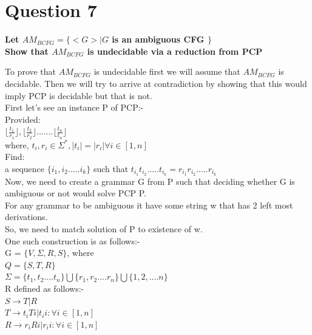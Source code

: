 \documentclass{article}
\begin{document}
\section{Question 7}

\textbf{Let $AM_{BCFG} = \{< G > | G$ is an ambiguous CFG $\}$ \\
    Show that $AM_{BCFG}$ is undecidable via a reduction from PCP\\}

To prove that $AM_{BCFG}$ is undecidable first we will assume that $AM_{BCFG}$ is decidable. Then 
we will try to arrive at contradiction by showing that this would imply PCP is decidable but that is not.\\

First let's see an instance P of PCP:- \\

Provided:\\
$\lfloor \frac{t_1}{r_1} \rfloor , \lfloor \frac{t_2}{r_2} \rfloor ....... \lfloor \frac{t_n}{t_n} \rfloor$ \\
where, $t_i , r_i \in \Sigma^* , |t_i| = |r_i| \forall i \in [1,n]$\\

Find:\\
a sequence $\{ i_1,i_2.....i_k \}$ such that $t_{i_1}t_{i_2}.....t_{i_k} = r_{i_1}r_{i_2}.....r_{i_k}$\\

Now, we need to create a grammar G from P such that deciding whether G is  ambiguous or not would solve PCP P.\\
For any grammar to be ambiguous it have some string w that has 2 left most derivations.\\
So, we need to match solution of P to existence of w.\\

One such construction is as follows:- \\

G = $\{ V,\Sigma, R, S \}$, where \\
$Q = \{S, T, R\}$\\
$\Sigma = \{t_1, t_2 .... t_n\} \bigcup \{r_1, r_2 .... r_n\} \bigcup \{1,2,....n\}$\\
R defined as follows:- \\
$S \rightarrow T | R$\\
$T \rightarrow t_iTi | t_i i :  \forall i \in [1,n] $\\
$R \rightarrow r_iRi | r_i i :  \forall i \in [1,n] $\\
\end{document}
